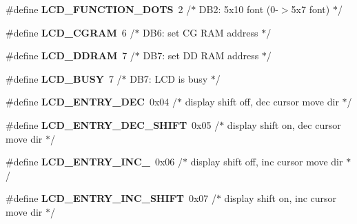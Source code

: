 \begin{DoxyCompactItemize}
\item 
\#define {\bfseries L\+C\+D\+\_\+\+F\+U\+N\+C\+T\+I\+O\+N\+\_\+D\+O\+TS}~2      /$\ast$   D\+B2\+: 5x10 font (0-\/$>$5x7 font)      $\ast$/\hypertarget{group__pfleury__lcd_ga48de81358277fe4f2810c2b82f90397e}{}\label{group__pfleury__lcd_ga48de81358277fe4f2810c2b82f90397e}

\item 
\#define {\bfseries L\+C\+D\+\_\+\+C\+G\+R\+AM}~6      /$\ast$ D\+B6\+: set CG R\+AM address             $\ast$/\hypertarget{group__pfleury__lcd_ga3b38de74c362be1781fef1136aa9684c}{}\label{group__pfleury__lcd_ga3b38de74c362be1781fef1136aa9684c}

\item 
\#define {\bfseries L\+C\+D\+\_\+\+D\+D\+R\+AM}~7      /$\ast$ D\+B7\+: set DD R\+AM address             $\ast$/\hypertarget{group__pfleury__lcd_gae54acf3ccc45b7d6be334a03627740c6}{}\label{group__pfleury__lcd_gae54acf3ccc45b7d6be334a03627740c6}

\item 
\#define {\bfseries L\+C\+D\+\_\+\+B\+U\+SY}~7      /$\ast$ D\+B7\+: L\+CD is busy                    $\ast$/\hypertarget{group__pfleury__lcd_gac8dd1658e235f174d1cabae5c438943d}{}\label{group__pfleury__lcd_gac8dd1658e235f174d1cabae5c438943d}

\item 
\#define {\bfseries L\+C\+D\+\_\+\+E\+N\+T\+R\+Y\+\_\+\+D\+EC}~0x04   /$\ast$ display shift off, dec cursor move dir $\ast$/\hypertarget{group__pfleury__lcd_gaad56f8e07634e85663f56888ae97089c}{}\label{group__pfleury__lcd_gaad56f8e07634e85663f56888ae97089c}

\item 
\#define {\bfseries L\+C\+D\+\_\+\+E\+N\+T\+R\+Y\+\_\+\+D\+E\+C\+\_\+\+S\+H\+I\+FT}~0x05   /$\ast$ display shift on,  dec cursor move dir $\ast$/\hypertarget{group__pfleury__lcd_ga1c62932f252c6262cbef728add9696e4}{}\label{group__pfleury__lcd_ga1c62932f252c6262cbef728add9696e4}

\item 
\#define {\bfseries L\+C\+D\+\_\+\+E\+N\+T\+R\+Y\+\_\+\+I\+N\+C\+\_\+}~0x06   /$\ast$ display shift off, inc cursor move dir $\ast$/\hypertarget{group__pfleury__lcd_gad27ddc4b8d03594662c8757f946dde28}{}\label{group__pfleury__lcd_gad27ddc4b8d03594662c8757f946dde28}

\item 
\#define {\bfseries L\+C\+D\+\_\+\+E\+N\+T\+R\+Y\+\_\+\+I\+N\+C\+\_\+\+S\+H\+I\+FT}~0x07   /$\ast$ display shift on,  inc cursor move dir $\ast$/\hypertarget{group__pfleury__lcd_gafabd0215cc6ae5539dc638dbec44a506}{}\label{group__pfleury__lcd_gafabd0215cc6ae5539dc638dbec44a506}


\end{DoxyCompactItemize}
